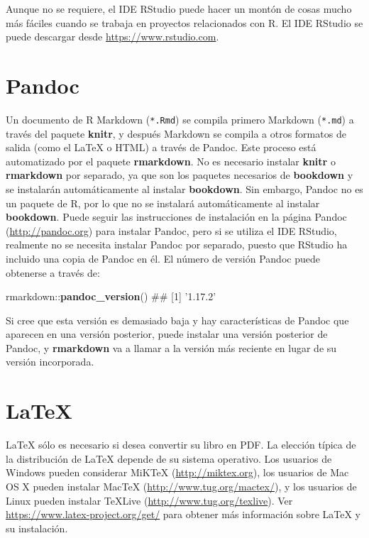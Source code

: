 \documentclass[12pt,]{krantz}
\makeatletter
\newenvironment{Shaded}{\begin{snugshade}}{\end{snugshade}}
\newcommand{\KeywordTok}[1]{\textcolor[rgb]{0.13,0.29,0.53}{\textbf{{#1}}}}
\newcommand{\NormalTok}[1]{{#1}}
\newenvironment{kframe}{%
\medskip{}
\setlength{\fboxsep}{.8em}
 \def\at@end@of@kframe{}%
 \ifinner\ifhmode%
  \def\at@end@of@kframe{\end{minipage}}%
  \begin{minipage}{\columnwidth}%
 \fi\fi%
 \def\FrameCommand##1{\hskip\@totalleftmargin \hskip-\fboxsep
 \colorbox{shadecolor}{##1}\hskip-\fboxsep
     \hskip-\linewidth \hskip-\@totalleftmargin \hskip\columnwidth}%
 \MakeFramed {\advance\hsize-\width
   \@totalleftmargin\z@ \linewidth\hsize
   \@setminipage}}%
 {\par\unskip\endMakeFramed%
 \at@end@of@kframe}
\renewenvironment{Shaded}{\begin{kframe}}{\end{kframe}}
\theoremstyle{definition}
\theoremstyle{definition}
\theoremstyle{remark}
\makeatother
\begin{document}
Aunque no se requiere, el IDE RStudio puede hacer un montón de cosas
mucho más fáciles cuando se trabaja en proyectos relacionados con R. El
IDE RStudio se puede descargar desde \url{https://www.rstudio.com}.

\section{Pandoc}\label{pandoc}

Un documento de R Markdown (\texttt{*.Rmd}) se compila primero Markdown
(\texttt{*.md}) a través del paquete \textbf{knitr}, y después Markdown
se compila a otros formatos de salida (como el LaTeX o HTML) a través de
Pandoc. Este proceso está automatizado por el paquete
\textbf{rmarkdown}. No es necesario instalar \textbf{knitr} o
\textbf{rmarkdown} por separado, ya que son los paquetes necesarios de
\textbf{bookdown} y se instalarán automáticamente al instalar
\textbf{bookdown}. Sin embargo, Pandoc no es un paquete de R, por lo que
no se instalará automáticamente al instalar \textbf{bookdown}. Puede
seguir las instrucciones de instalación en la página Pandoc
(\url{http://pandoc.org}) para instalar Pandoc, pero si se utiliza el
IDE RStudio, realmente no se necesita instalar Pandoc por separado,
puesto que RStudio ha incluido una copia de Pandoc en él. El número de
versión Pandoc puede obtenerse a través de:

\begin{Shaded}
\begin{Highlighting}[]
\NormalTok{rmarkdown::}\KeywordTok{pandoc_version}\NormalTok{()}
\NormalTok{## [1] '1.17.2'}
\end{Highlighting}
\end{Shaded}

Si cree que esta versión es demasiado baja y hay características de
Pandoc que aparecen en una versión posterior, puede instalar una versión
posterior de Pandoc, y \textbf{rmarkdown} va a llamar a la versión más
reciente en lugar de su versión incorporada.

\section{LaTeX}\label{latex}

LaTeX sólo es necesario si desea convertir su libro en PDF.
La elección típica de la distribución de LaTeX depende de su sistema
operativo. Los usuarios de Windows pueden considerar MiKTeX
(\url{http://miktex.org}), los usuarios de Mac OS X pueden instalar
MacTeX (\url{http://www.tug.org/mactex/}), y los usuarios de Linux
pueden instalar TeXLive (\url{http://www.tug.org/texlive}). Ver
\url{https://www.latex-project.org/get/} para obtener más información
sobre LaTeX y su instalación.
\end{document}
